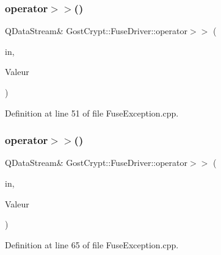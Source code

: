 \subsubsection{\texorpdfstring{operator$>$$>$()}{operator>>()}\hspace{0.1cm}{\footnotesize\ttfamily [3/6]}}
{\footnotesize\ttfamily Q\+Data\+Stream\& Gost\+Crypt\+::\+Fuse\+Driver\+::operator$>$$>$ (\begin{DoxyParamCaption}\item[{Q\+Data\+Stream \&}]{in,  }\item[{\hyperlink{class_gost_crypt_1_1_fuse_driver_1_1_fuse_control_file_access_failed}{Gost\+Crypt\+::\+Fuse\+Driver\+::\+Fuse\+Control\+File\+Access\+Failed} \&}]{Valeur }\end{DoxyParamCaption})}



Definition at line 51 of file Fuse\+Exception.\+cpp.

\mbox{\label{namespace_gost_crypt_1_1_fuse_driver_a12257ab43940149308ca56d261ad5bd1}} 
\subsubsection{\texorpdfstring{operator$>$$>$()}{operator>>()}\hspace{0.1cm}{\footnotesize\ttfamily [4/6]}}
{\footnotesize\ttfamily Q\+Data\+Stream\& Gost\+Crypt\+::\+Fuse\+Driver\+::operator$>$$>$ (\begin{DoxyParamCaption}\item[{Q\+Data\+Stream \&}]{in,  }\item[{\hyperlink{class_gost_crypt_1_1_fuse_driver_1_1_fuse_fork_failed}{Gost\+Crypt\+::\+Fuse\+Driver\+::\+Fuse\+Fork\+Failed} \&}]{Valeur }\end{DoxyParamCaption})}



Definition at line 65 of file Fuse\+Exception.\+cpp.

\mbox{\label{namespace_gost_crypt_1_1_fuse_driver_a80bdf11c0f9e7a75c7644128e42d93ec}} 

